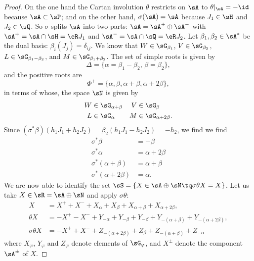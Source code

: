 \begin{proof}
On the one hand the Cartan involution $\theta$ restricts on $\sA$ to $\theta|_{\sA}=-\id$ because $\sA\subset\sP$; and on the other hand, $\sigma(\sA)=\sA$ because $J_1\in\sH$ and $J_2\in\sQ$. So $\sigma$ splits $\sA$ into two parts:  $\sA=\sA^{+}\oplus\sA^{-}$ with $\sA^+=\sA\cap\sH=\eR J_1$ and $\sA^-=\sA\cap\sQ=\eR J_2$. Let $\beta_{1},\beta_{2}\in\sA^*$ be the dual basis: $\beta_{i}(J_{j})=\delta_{ij}$.  We know that $W\in\sG_{\beta_{1}}$, $V\in\sG_{\beta_{2}}$, $L\in\sG_{\beta_{1}-\beta_{2}}$, and $M\in\sG_{\beta_{1}+\beta_{2}}$.  The set of simple roots is given by
\[ 
  \Delta=\{ \alpha=\beta_{1}-\beta_{2},\,\beta=\beta_{2} \},
\]
and the positive roots are
\[ 
 \Phi^{+}=\{ \alpha,\beta,\alpha+\beta,\alpha+2\beta \},
\]
in terms of whose, the space $\sN$ is given by
\begin{align*}
W&\in\sG_{\alpha+\beta}&V&\in\sG_{\beta}\\
L&\in\sG_{\alpha}&M&\in\sG_{\alpha+2\beta}.
\end{align*}
Since $(\sigma^*\beta)(h_1J_1+h_2J_2)=\beta_{2}(h_1J_1-h_2J_2)=-h_2$, we find
 we find
\begin{align*}
 \sigma^*\beta&=-\beta\\
\sigma^*\alpha&=\alpha+2\beta\\
\sigma^*(\alpha+\beta)&=\alpha+\beta\\
\sigma^*(\alpha+2\beta)&=\alpha.
\end{align*}
We are now able to identify the set $\sS=\{ X\in\sA\oplus\sN\tq \sigma\theta X=X \}$. Let us take $X\in\sR=\sA\oplus\sN$ and apply $\sigma\theta$:
\begin{equation}
\begin{split}
  X&=X^++X^-+X_{\alpha}+X_{\beta}+X_{\alpha+\beta}+X_{\alpha+2\beta},\\
\theta X&=-X^+-X^-+Y_{-\alpha}+Y_{-\beta}+Y_{-\beta}+Y_{-(\alpha+\beta)}+Y_{-(\alpha+2\beta)},\\
\sigma\theta X&=-X^++X^-+Z_{-(\alpha+2\beta)}+Z_{\beta}+Z_{-(\alpha+\beta)}+Z_{-\alpha}
\end{split}
\end{equation}
where $X_{\varphi}$, $Y_{\varphi}$ and $Z_{\varphi}$ denote elements of $\sG_{\varphi}$, and $X^{\pm}$ denote the component $\sA^{\pm}$ of $X$.


\end{proof}
